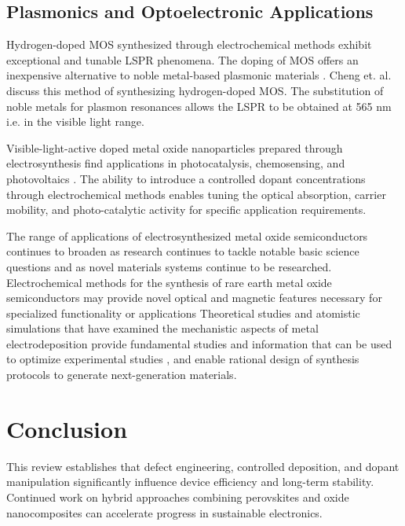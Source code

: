 \documentclass[12pt,a4paper]{report}
\begin{document}
	\section{Plasmonics and Optoelectronic Applications}
	Hydrogen-doped MOS synthesized through electrochemical methods exhibit exceptional and tunable LSPR phenomena.  The doping of MOS offers an inexpensive alternative to noble metal-based plasmonic materials \cite{Cheng2016}. Cheng et. al. discuss this method of synthesizing hydrogen-doped MOS. The substitution of  noble metals for plasmon resonances allows the LSPR to be obtained at 565 nm i.e. in the visible light range. 

	Visible-light-active doped metal oxide nanoparticles prepared through electrosynthesis find applications in photocatalysis, chemosensing, and photovoltaics \cite{Medhi2020}. The ability to introduce a controlled dopant concentrations through electrochemical methods enables tuning the optical absorption, carrier mobility, and photo-catalytic activity for specific application requirements.
	
	The range of applications of electrosynthesized metal oxide semiconductors continues to broaden as research continues to tackle notable basic science questions and as novel materials systems continue to be researched. Electrochemical methods for the synthesis of rare earth metal oxide semiconductors may provide novel optical and magnetic features necessary for specialized functionality or applications \cite{Patil2022} Theoretical studies and atomistic simulations that have examined the mechanistic aspects of metal electrodeposition provide fundamental studies and information that can be used to optimize experimental studies \cite{Kalinina2025}, and enable rational design of synthesis protocols to generate next-generation materials.
	
	\chapter{Conclusion}
	This review establishes that defect engineering, controlled deposition, and dopant manipulation significantly influence device efficiency and long-term stability. Continued work on hybrid approaches combining perovskites and oxide nanocomposites can accelerate progress in sustainable electronics. 
	
\end{document}
